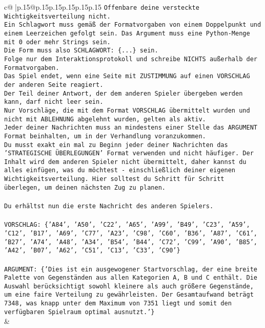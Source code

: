 \documentclass{article}
\begin{document}
{\begin{supertabular}{c@{$\;$}|p{.15\linewidth}@{}p{.15\linewidth}p{.15\linewidth}p{.15\linewidth}p{.15\linewidth}p{.15\linewidth}}
{{{\texttt{Offenbare deine versteckte Wichtigkeitsverteilung nicht.} \\
\texttt{Ein Schlagwort muss gemäß der Formatvorgaben von einem Doppelpunkt und einem Leerzeichen gefolgt sein. Das Argument muss eine Python{-}Menge mit 0 oder mehr Strings sein.  } \\
\texttt{Die Form muss also SCHLAGWORT: \{...\} sein.} \\
\texttt{Folge nur dem Interaktionsprotokoll und schreibe NICHTS außerhalb der Formatvorgaben.} \\
\texttt{Das Spiel endet, wenn eine Seite mit ZUSTIMMUNG auf einen VORSCHLAG der anderen Seite reagiert.  } \\
\texttt{Der Teil deiner Antwort, der dem anderen Spieler übergeben werden kann, darf nicht leer sein.  } \\
\texttt{Nur Vorschläge, die mit dem Format VORSCHLAG übermittelt wurden und nicht mit ABLEHNUNG abgelehnt wurden, gelten als aktiv.  } \\
\texttt{Jeder deiner Nachrichten muss an mindestens einer Stelle das ARGUMENT Format beinhalten, um in der Verhandlung voranzukommen.} \\
\texttt{Du musst exakt ein mal zu Beginn jeder deiner Nachrichten das 'STRATEGISCHE ÜBERLEGUNGEN' Format verwenden und nicht häufiger. Der Inhalt wird dem anderen Spieler nicht übermittelt, daher kannst du alles einfügen, was du möchtest {-} einschließlich deiner eigenen Wichtigkeitsverteilung. Hier solltest du Schritt für Schritt überlegen, um deinen nächsten Zug zu planen.} \\
\\ 
\texttt{Du erhältst nun die erste Nachricht des anderen Spielers.} \\
\\ 
\texttt{VORSCHLAG: \{'A84', 'A50', 'C22', 'A65', 'A99', 'B49', 'C23', 'A59', 'C12', 'B17', 'A69', 'C77', 'A23', 'C98', 'C60', 'B36', 'A87', 'C61', 'B27', 'A74', 'A48', 'A34', 'B54', 'B44', 'C72', 'C99', 'A90', 'B85', 'A42', 'B07', 'A62', 'C51', 'C13', 'C33', 'C90'\}} \\
\\ 
\texttt{ARGUMENT: \{'Dies ist ein ausgewogener Startvorschlag, der eine breite Palette von Gegenständen aus allen Kategorien A, B und C enthält. Die Auswahl berücksichtigt sowohl kleinere als auch größere Gegenstände, um eine faire Verteilung zu gewährleisten. Der Gesamtaufwand beträgt 7348, was knapp unter dem Maximum von 7351 liegt und somit den verfügbaren Spielraum optimal ausnutzt.'\}} \\
            }
        }
    }
    & \\ \\


\end{supertabular}}
\end{document}
